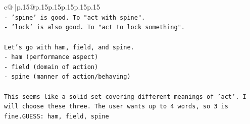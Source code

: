 \documentclass{article}
\begin{document}
{\begin{supertabular}{c@{$\;$}|p{.15\linewidth}@{}p{.15\linewidth}p{.15\linewidth}p{.15\linewidth}p{.15\linewidth}p{.15\linewidth}}
{{{\\ 
\texttt{{-} 'spine' is good. To "act with spine".} \\
\texttt{{-} 'lock' is also good. To "act to lock something".} \\
\\ 
\texttt{Let's go with ham, field, and spine.} \\
\texttt{{-} ham (performance aspect)} \\
\texttt{{-} field (domain of action)} \\
\texttt{{-} spine (manner of action/behaving)} \\
\\ 
\texttt{This seems like a solid set covering different meanings of 'act'. I will choose these three. The user wants up to 4 words, so 3 is fine.GUESS: ham, field, spine} \\
            }
        }
    }
     \\ \\


\end{supertabular}}
\end{document}
